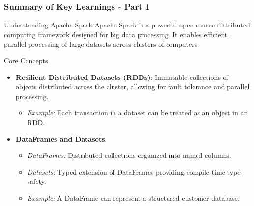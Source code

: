 \documentclass[aspectratio=169]{beamer}
\begin{document}
\begin{frame}[fragile]
  \frametitle{Summary of Key Learnings - Part 1}
  \begin{block}{Understanding Apache Spark}
      Apache Spark is a powerful open-source distributed computing framework designed for big data processing. It enables efficient, parallel processing of large datasets across clusters of computers.
  \end{block}

  \begin{block}{Core Concepts}
      \begin{itemize}
          \item \textbf{Resilient Distributed Datasets (RDDs)}: 
          Immutable collections of objects distributed across the cluster, allowing for fault tolerance and parallel processing.
          \begin{itemize}
              \item \textit{Example:} Each transaction in a dataset can be treated as an object in an RDD.
          \end{itemize}
          \item \textbf{DataFrames and Datasets}:
          \begin{itemize}
              \item \textit{DataFrames:} Distributed collections organized into named columns.
              \item \textit{Datasets:} Typed extension of DataFrames providing compile-time type safety.
              \item \textit{Example:} A DataFrame can represent a structured customer database.
          \end{itemize}
      \end{itemize}
  \end{block}
\end{frame}
\end{document}
